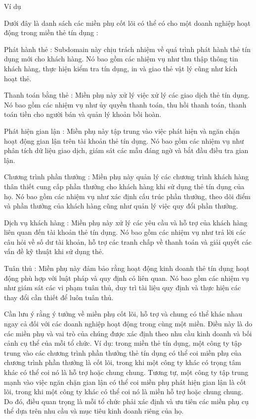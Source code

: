 Ví dụ

Dưới đây là danh sách các miền phụ cốt lõi có thể có cho một doanh nghiệp hoạt động trong miền thẻ tín dụng :

Phát hành thẻ : Subdomain này chịu trách nhiệm về quá trình phát hành thẻ tín dụng mới cho khách hàng. Nó bao gồm các nhiệm vụ như thu thập thông tin khách hàng, thực hiện kiểm tra tín dụng, in và giao thẻ vật lý cũng như kích hoạt thẻ.

Thanh toán bằng thẻ : Miền phụ này xử lý việc xử lý các giao dịch thẻ tín dụng. Nó bao gồm các nhiệm vụ như ủy quyền thanh toán, thu hồi thanh toán, thanh toán tiền cho người bán và quản lý khoản bồi hoàn.

Phát hiện gian lận : Miền phụ này tập trung vào việc phát hiện và ngăn chặn hoạt động gian lận trên tài khoản thẻ tín dụng. Nó bao gồm các nhiệm vụ như phân tích dữ liệu giao dịch, giám sát các mẫu đáng ngờ và bắt đầu điều tra gian lận.

Chương trình phần thưởng : Miền phụ này quản lý các chương trình khách hàng thân thiết cung cấp phần thưởng cho khách hàng khi sử dụng thẻ tín dụng của họ. Nó bao gồm các nhiệm vụ như xác định cấu trúc phần thưởng, theo dõi điểm và phần thưởng của khách hàng cũng như quản lý việc quy đổi phần thưởng.

Dịch vụ khách hàng : Miền phụ này xử lý các yêu cầu và hỗ trợ của khách hàng liên quan đến tài khoản thẻ tín dụng. Nó bao gồm các nhiệm vụ như trả lời các câu hỏi về số dư tài khoản, hỗ trợ các tranh chấp về thanh toán và giải quyết các vấn đề kỹ thuật khi sử dụng thẻ.

Tuân thủ : Miền phụ này đảm bảo rằng hoạt động kinh doanh thẻ tín dụng hoạt động phù hợp với luật pháp và quy định có liên quan. Nó bao gồm các nhiệm vụ như giám sát các vi phạm tuân thủ, duy trì tài liệu quy định và thực hiện các thay đổi cần thiết để luôn tuân thủ.

Cần lưu ý rằng ý tưởng về miền phụ cốt lõi, hỗ trợ và chung có thể khác nhau ngay cả đối với các doanh nghiệp hoạt động trong cùng một miền. Điều này là do các miền phụ và vai trò của chúng được xác định theo nhu cầu kinh doanh và bối cảnh cụ thể của mỗi tổ chức. Ví dụ: trong miền thẻ tín dụng, một công ty tập trung vào các chương trình phần thưởng thẻ tín dụng có thể coi miền phụ của chương trình phần thưởng là cốt lõi, trong khi một công ty khác có trọng tâm khác có thể coi nó là hỗ trợ hoặc chung chung. Tương tự, một công ty tập trung mạnh vào việc ngăn chặn gian lận có thể coi miền phụ phát hiện gian lận là cốt lõi, trong khi một công ty khác có thể coi nó là miền hỗ trợ hoặc chung chung. Do đó, điều quan trọng là mỗi tổ chức phải xác định và ưu tiên các miền phụ cụ thể dựa trên nhu cầu và mục tiêu kinh doanh riêng của họ.

